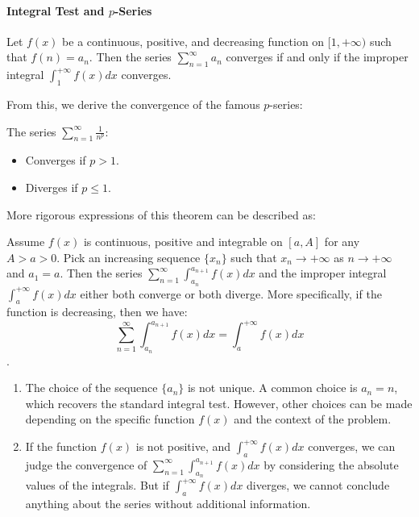 \paragraph{Integral Test and $p$-Series}
\begin{theorem}
Let $f(x)$ be a continuous, positive, and decreasing function on $[1, +\infty)$ such that $f(n) = a_n$. Then the series $\sum_{n=1}^{\infty} a_n$ converges if and only if the improper integral $\int_1^{+\infty} f(x) dx$ converges.
\end{theorem}

From this, we derive the convergence of the famous $p$-series:
\begin{corollary}[$p$-Series]
The series $\sum_{n=1}^{\infty} \frac{1}{n^p}$:
\begin{itemize}
    \item Converges if $p > 1$.
    \item Diverges if $p \le 1$.
\end{itemize}
\end{corollary}

More rigorous expressions of this theorem can be described as:

\begin{theorem}
    Assume $f(x)$ is continuous, positive and integrable on $[a,A]$ for any $A>a>0$. Pick an increasing sequence $\{x_n\}$ such that $x_n \to +\infty$ as $n \to +\infty$ and $a_1 = a$. Then the series $\sum_{n=1}^{\infty} \int_{a_n}^{a_{n+1}} f(x) dx$ and the improper integral $\int_a^{+\infty} f(x) dx$ either both converge or both diverge. 
    More specifically, if the function is decreasing, then we have:
    \[\sum_{n=1}^{\infty} \int_{a_n}^{a_{n+1}} f(x) dx = \int_a^{+\infty} f(x) dx\].
\end{theorem}

\begin{remark}
    \begin{enumerate}
        \item The choice of the sequence $\{a_n\}$ is not unique. A common choice is $a_n = n$, which recovers the standard integral test. However, other choices can be made depending on the specific function $f(x)$ and the context of the problem.
        \item If the function $f(x)$ is not positive, and $\int_a^{+\infty} f(x) dx$ converges, we can judge the convergence of $\sum_{n=1}^{\infty} \int_{a_n}^{a_{n+1}} f(x) dx$ by considering the absolute values of the integrals. But if $\int_a^{+\infty} f(x) dx$ diverges, we cannot conclude anything about the series without additional information.
    \end{enumerate}
\end{remark}

